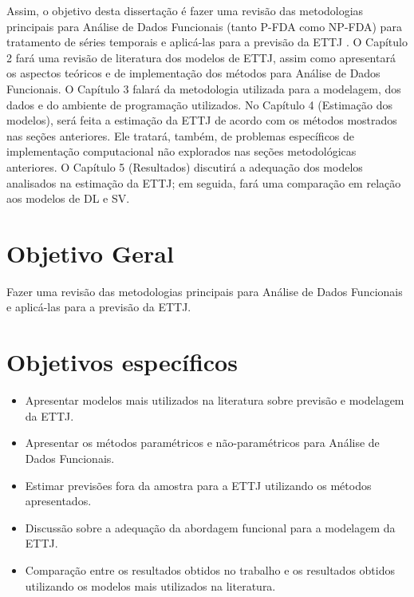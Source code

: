 \documentclass[
	12pt,				%
	openright,			%
	oneside,			%
	a4paper,			%
	english,			%
	brazil				%
	]{dissertacao-ufrgs-abntex2}
\begin{document}
Assim, o objetivo desta dissertação é fazer uma revisão das metodologias
principais para Análise de Dados Funcionais (tanto P-FDA como NP-FDA)
para tratamento de séries temporais e aplicá-las para a previsão da
ETTJ . O Capítulo 2 fará uma revisão de literatura dos modelos de
ETTJ, assim como apresentará os aspectos teóricos e de implementação
dos métodos para Análise de Dados Funcionais. O Capítulo 3 falará
da metodologia utilizada para a modelagem, dos dados e do ambiente
de programação utilizados. No Capítulo 4 (Estimação dos modelos),
será feita a estimação da ETTJ de acordo com os métodos mostrados
nas seções anteriores. Ele tratará, também, de problemas específicos
de implementação computacional não explorados nas seções metodológicas
anteriores. O Capítulo 5 (Resultados)  discutirá a adequação dos modelos
analisados na estimação da ETTJ; em seguida, fará uma comparação em
relação aos modelos de DL e SV. 



\section*{Objetivo Geral}

Fazer uma revisão das metodologias principais para Análise de Dados Funcionais e aplicá-las para a previsão da ETTJ. 

\section*{Objetivos específicos}

\begin{itemize}
\item Apresentar modelos mais utilizados na literatura sobre previsão e modelagem da ETTJ.
\item Apresentar os métodos paramétricos e não-paramétricos para Análise
de Dados Funcionais.
\item Estimar previsões fora da amostra para a ETTJ utilizando os métodos apresentados.
\item Discussão sobre a adequação da abordagem funcional para a modelagem
da ETTJ.
\item Comparação entre os resultados obtidos no trabalho e os resultados
obtidos utilizando os modelos mais utilizados na literatura. \end{itemize}


\end{document}
